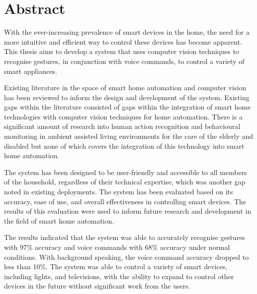 \chapter*{Abstract}\label{abstract}

With the ever-increasing prevalence of smart devices in the home, the need for a more intuitive and efficient way to control these devices has become apparent.
This thesis aims to develop a system that uses computer vision techniques to recognise gestures, in conjunction with voice commands, to control a variety of smart appliances.

Existing literature in the space of smart home automation and computer vision has been reviewed to inform the design and development of the system.
Existing gaps within the literature consisted of gaps within the integration of smart home technologies with computer vision techniques for home automation.
There is a significant amount of research into human action recognition and behavioural monitoring in ambient assisted living environments for the care of the elderly and disabled but none of which covers the integration of this technology into smart home automation.

The system has been designed to be user-friendly and accessible to all members of the household, regardless of their technical expertise, which was another gap noted in existing deployments.
The system has been evaluated based on its accuracy, ease of use, and overall effectiveness in controlling smart devices.
The results of this evaluation were used to inform future research and development in the field of smart home automation.

The results indicated that the system was able to accurately recognise gestures with 97\% accuracy and voice commands with 68\% accuracy under normal conditions.
With background speaking, the voice command accuracy dropped to less than 10\%.
The system was able to control a variety of smart devices, including lights, and televisions, with the ability to expand to control other devices in the future without significant work from the users.